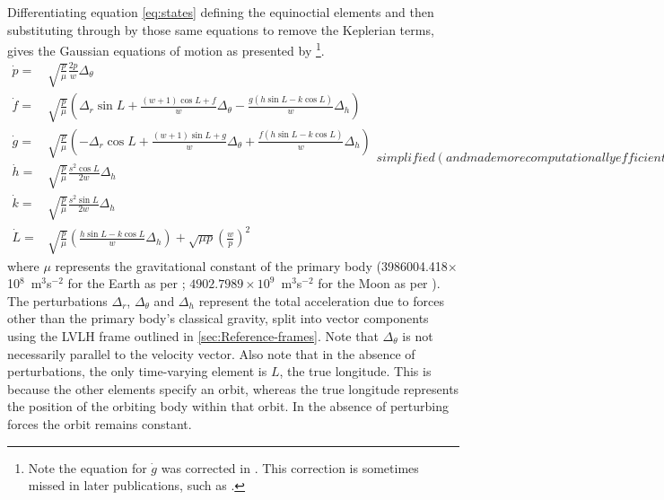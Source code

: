 Differentiating equation \eqref{eq:states} defining the equinoctial elements and then substituting through by those same equations to remove the Keplerian terms, gives the Gaussian equations of motion as presented by \cite{Walker1985,Walker1986,Keppeler_thesis,Erb_thesis,Letterio_thesis,Hintz2008} \footnote{Note the equation for $\dot{g}$ was corrected in \textcite{Walker1986}. This correction is sometimes missed in later publications, such as \textcite{Hintz2008}.}.
\begin{subequations}\label{eq:state-updates}
\begin{eqnarray}
\dot{p} = & \sqrt{\frac{p}{\mu}}\frac{2p}{w}\Delta_\theta \label{eq:pdot}\\
\dot{f} = & \sqrt{\frac{p}{\mu}}\left(\Delta_r\sin L+\frac{\left(w+1\right)\cos L+f}{w}\Delta_\theta-\frac{g\left(h\sin L-k\cos L\right)}{w}\Delta_h \right) \label{eq:fdot}\\
\dot{g} = & \sqrt{\frac{p}{\mu}}\left(-\Delta_r\cos L+\frac{\left(w+1\right)\sin L+g}{w}\Delta_\theta+\frac{f\left(h\sin L-k\cos L\right)}{w}\Delta_h \right) \label{eq:gdot}\\
\dot{h} = & \sqrt{\frac{p}{\mu}}\frac{s^{2}\cos L}{2w}\Delta_h \label{eq:hdot}\\
\dot{k} = & \sqrt{\frac{p}{\mu}}\frac{s^{2}\sin L}{2w}\Delta_h \label{eq:kdot}\\
\dot{L} = & \sqrt{\frac{p}{\mu}}\left(\frac{h\sin L-k\cos L}{w}\Delta_h \right)+\sqrt{\mu p}\left(\frac{w}{p}\right)^{2} \label{eq:Ldot}
\end{eqnarray}
simplified (and made more computationally efficient) using the terms
\begin{eqnarray}
w & = & 1+f\cos L+g\sin L\label{eq:w_helper}\\
s^{2} & = & 1+h^{2}+k^{2}\label{eq:s2_helper}
\end{eqnarray}
\end{subequations}
where $\mu$ represents the gravitational constant of the primary body \linebreak (3986004.418$\times$10$^8$~m$^3$s$^{-2}$ for the Earth as per \cite{WGS84}; $4902.7989\times10^9$~m$^3$s$^{-2}$ for the Moon as per \cite{Zhang1994}). The perturbations $\Delta_r$, $\Delta_\theta$ and $\Delta_h$ represent the total acceleration due to forces other than the primary body's classical gravity, split into vector components using the LVLH frame outlined in \autoref{sec:Reference-frames}. Note that $\Delta_\theta$ is not necessarily parallel to the velocity vector. Also note that in the absence of perturbations, the only time-varying element is $L$, the true longitude. This is because the other elements specify an orbit, whereas the true longitude represents the position of the orbiting body within that orbit. In the absence of perturbing forces the orbit remains constant.




